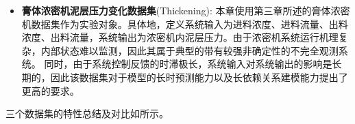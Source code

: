 \begin{itemize}
    \item \textbf{膏体浓密机泥层压力变化数据集}(Thickening):
    本章使用第三章所述的膏体浓密机数据集作为实验对象。具体地，定义系统输入为进料浓度、进料流量、出料浓度、出料流量，系统输出为浓密机内泥层压力。由于浓密机系统运行机理复杂，内部状态难以监测，因此其属于典型的带有较强非确定性的不完全观测系统。
    同时，由于系统控制反馈的时滞极长，系统输入对系统输出的影响是长期的，因此该数据集对于模型的长时预测能力以及长依赖关系建模能力提出了更高的要求。
    
\end{itemize}
三个数据集的特性总结及对比如所示。
\begin{table}
\centering
\caption{数据集特性}
\label{tab:5_dataset}
\end{table}
